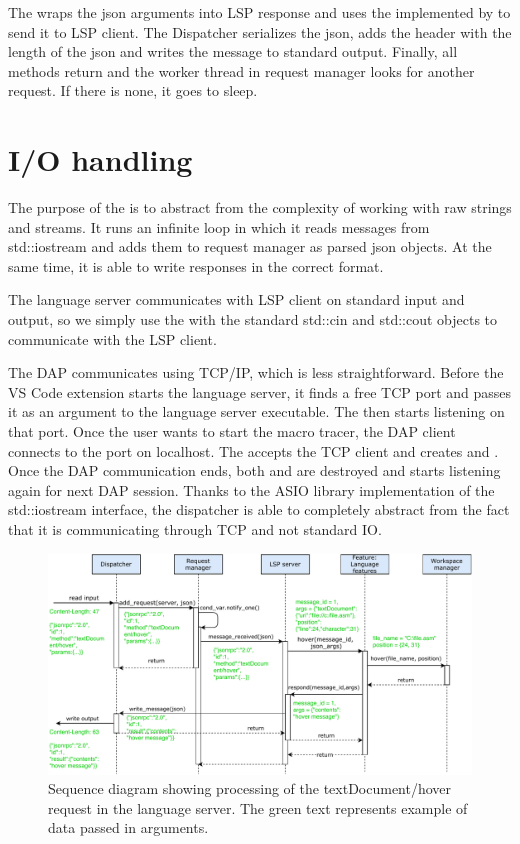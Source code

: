 The  wraps the json arguments into LSP response and uses the  implemented by  to send it to LSP client. The Dispatcher serializes the json, adds the header with the length of the json and writes the message to standard output. Finally, all methods return and the worker thread in request manager looks for another request. If there is none, it goes to sleep.

\section{I/O handling}
The purpose of the  is to abstract from the complexity of working with raw strings and streams. It runs an infinite loop in which it reads messages from std::iostream and adds them to request manager as parsed json objects. At the same time, it is able to write responses in the correct format.

The language server communicates with LSP client on standard input and output, so we simply use the  with the standard std::cin and std::cout objects to communicate with the LSP client.

The DAP communicates using TCP/IP, which is less straightforward. Before the VS Code extension starts the language server, it finds a free TCP port and passes it as an argument to the language server executable. The  then starts listening on that port. Once the user wants to start the macro tracer, the DAP client connects to the port on localhost. The  accepts the TCP client and creates  and . Once the DAP communication ends, both  and  are destroyed and  starts listening again for next DAP session. Thanks to the ASIO library implementation of the std::iostream interface, the dispatcher is able to completely abstract from the fact that it is communicating through TCP and not standard IO.

\begin{landscape}
	\begin{figure}
		\centering
		\includegraphics[width=21cm]{img/hover_sequence}
		\caption{Sequence diagram showing processing of the textDocument/hover request in the language server. The green text represents example of data passed in arguments.}
		\label{hover_sequence}
	\end{figure}
\end{landscape}




